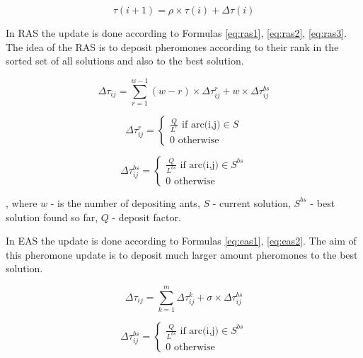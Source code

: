 \documentclass[12pt]{article}
\begin{document}
\begin{equation}
\tau(i+1) = \rho \times \tau(i) + \Delta\tau(i)
\label{eq:pheromone-general}
\end{equation}

In RAS the update is done according to Formulas \ref{eq:ras1}, \ref{eq:ras2}, \ref{eq:ras3}. The idea of the RAS is to deposit pheromones according to their rank in the sorted set of all solutions and also to the best solution.

\begin{equation}
\Delta\tau_{ij} = \sum_{r=1}^{w-1} (w-r) \times \Delta \tau_{ij}^r + w \times \Delta \tau_{ij}^{bs}
\label{eq:ras1}
\end{equation}

\begin{equation}
\Delta\tau_{ij}^r = \begin{cases}
    \frac{Q}{L^r} \text{ if arc(i,j)} \in S\\
    0 \text{ otherwise}
  \end{cases}
\label{eq:ras2}
\end{equation}

\begin{equation}
\Delta\tau_{ij}^{bs} = \begin{cases}
    \frac{Q}{L^{bs}} \text{ if arc(i,j)} \in S^{bs}\\
    0 \text{ otherwise}
  \end{cases}
\label{eq:ras3}
\end{equation}

, where $w$ - is the number of depositing ants,
$S$ - current solution,
$S^{bs}$ - best solution found so far,
$Q$ - deposit factor.

In EAS the update is done according to Formulas \ref{eq:eas1}, \ref{eq:eas2}. The aim of this pheromone update is to deposit much larger amount pheromones to the best solution.

\begin{equation}
\Delta\tau_{ij} = \sum_{k=1}^{m} \Delta \tau_{ij}^k + \sigma \times \Delta\tau_{ij}^{bs}
\label{eq:eas1}
\end{equation}

\begin{equation}
\Delta\tau_{ij}^{bs} = \begin{cases}
    \frac{Q}{L^{bs}} \text{ if arc(i,j)} \in S^{bs}\\
    0 \text{ otherwise}
  \end{cases}
\label{eq:eas2}
\end{equation}
\end{document}
